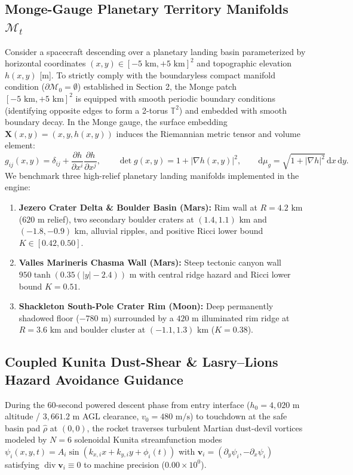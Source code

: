 \documentclass[11pt,a4paper,reqno]{article}
\theoremstyle{definition}
\theoremstyle{remark}
\begin{document}
\subsection{Monge-Gauge Planetary Territory Manifolds $\mathcal{M}_t$}
Consider a spacecraft descending over a planetary landing basin parameterized by horizontal coordinates $(x, y) \in [-5\text{ km}, +5\text{ km}]^2$ and topographic elevation $h(x,y)$ [m]. To strictly comply with the boundaryless compact manifold condition ($\partial \mathcal{M}_0 = \emptyset$) established in Section 2, the Monge patch $[-5\text{ km}, +5\text{ km}]^2$ is equipped with smooth periodic boundary conditions (identifying opposite edges to form a 2-torus $\mathbb{T}^2$) and embedded with smooth boundary decay. In the Monge gauge, the surface embedding $\mathbf{X}(x,y) = (x, y, h(x,y))$ induces the Riemannian metric tensor and volume element:
\begin{equation}\label{eq:monge_metric}
  g_{ij}(x,y) = \delta_{ij} + \frac{\partial h}{\partial x^i}\frac{\partial h}{\partial x^j}, \qquad
  \det g(x,y) = 1 + |\nabla h(x,y)|^2, \qquad \mathrm{d}\mu_g = \sqrt{1 + |\nabla h|^2}\,\mathrm{d}x\,\mathrm{d}y.
\end{equation}
We benchmark three high-relief planetary landing manifolds implemented in the engine:
\begin{enumerate}
  \item \textbf{Jezero Crater Delta \& Boulder Basin (Mars):} Rim wall at $R = 4.2\text{ km}$ ($620\text{ m}$ relief), two secondary boulder craters at $(1.4, 1.1)\text{ km}$ and $(-1.8, -0.9)\text{ km}$, alluvial ripples, and positive Ricci lower bound $K \in [0.42, 0.50]$.
  \item \textbf{Valles Marineris Chasma Wall (Mars):} Steep tectonic canyon wall $950\tanh(0.35(|y|-2.4))\text{ m}$ with central ridge hazard and Ricci lower bound $K = 0.51$.
  \item \textbf{Shackleton South-Pole Crater Rim (Moon):} Deep permanently shadowed floor ($-780\text{ m}$) surrounded by a $420\text{ m}$ illuminated rim ridge at $R = 3.6\text{ km}$ and boulder cluster at $(-1.1, 1.3)\text{ km}$ ($K = 0.38$).
\end{enumerate}

\subsection{Coupled Kunita Dust-Shear \& Lasry--Lions Hazard Avoidance Guidance}
During the 60-second powered descent phase from entry interface ($h_0 = 4,020\text{ m}$ altitude / $3,661.2\text{ m}$ AGL clearance, $v_0 = 480\text{ m/s}$) to touchdown at the safe basin pad $\hat{\rho}$ at $(0,0)$, the rocket traverses turbulent Martian dust-devil vortices modeled by $N = 6$ solenoidal Kunita streamfunction modes $\psi_i(x,y,t) = A_i \sin(k_{x,i} x + k_{y,i} y + \phi_i(t))$ with $\mathbf{v}_i = (\partial_y\psi_i, -\partial_x\psi_i)$ satisfying $\operatorname{div}\mathbf{v}_i \equiv 0$ to machine precision ($0.00 \times 10^0$).
\end{document}
